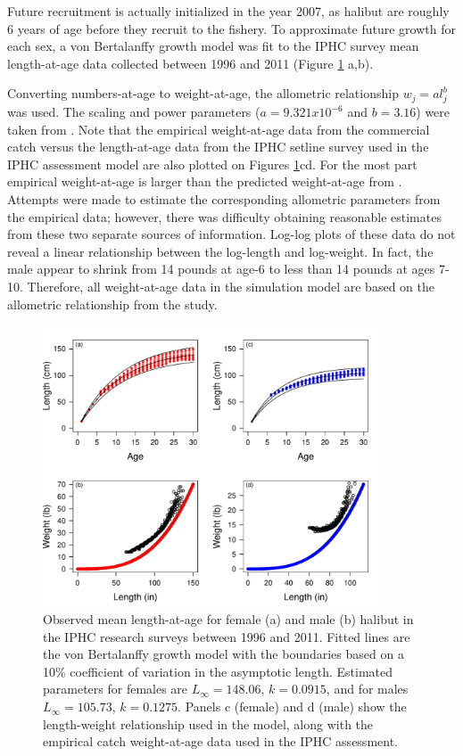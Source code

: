 Future recruitment is actually initialized in the year 2007, as halibut are roughly 6 years of age before they recruit to the fishery. 
To approximate future growth for each sex, a von Bertalanffy growth model was fit to the IPHC survey mean length-at-age data collected between 1996 and 2011 (Figure \ref{fig:FIGURES_figLengthAtAgeFit} a,b).    

Converting numbers-at-age to weight-at-age, the allometric relationship $w_j= a l_j^b$ was used.  The scaling and power parameters ($a=9.321x10^{-6}$ and $b=3.16$) were taken from \cite{courcellesre}.  Note that the empirical weight-at-age data from the commercial catch versus the length-at-age data from the IPHC setline survey used in the IPHC assessment model are also plotted on Figures \ref{fig:FIGURES_figLengthAtAgeFit}cd. For the most part empirical weight-at-age is larger than the predicted weight-at-age from \cite{courcellesre}.  Attempts were made to estimate the corresponding allometric parameters from the empirical data; however, there was difficulty obtaining reasonable estimates from these two separate sources of information.  Log-log plots of these data do not reveal a linear relationship between the log-length and log-weight.  In fact, the male appear to shrink from 14 pounds at age-6 to less than 14 pounds at ages 7-10.  Therefore, all weight-at-age data in the simulation model are based on the allometric relationship from the \cite{courcellesre} study.
   
\begin{figure}[htbp]
	\centering
		\includegraphics[width=0.9\textwidth]{../FIGURES/figLengthAtAgeFit.pdf}
	\caption{Observed mean length-at-age for female (a) and male (b) halibut in the IPHC research surveys between 1996 and 2011. Fitted lines are the von Bertalanffy growth model with the boundaries based on a 10\% coefficient of variation in the asymptotic length. Estimated parameters for females are $L_\infty=148.06$, $k=0.0915$, and for males $L_\infty=105.73$, $k=0.1275$. Panels c  (female) and d (male) show the length-weight relationship used in the model, along with the empirical catch weight-at-age data used in the IPHC assessment.}
	\label{fig:FIGURES_figLengthAtAgeFit}
\end{figure}



